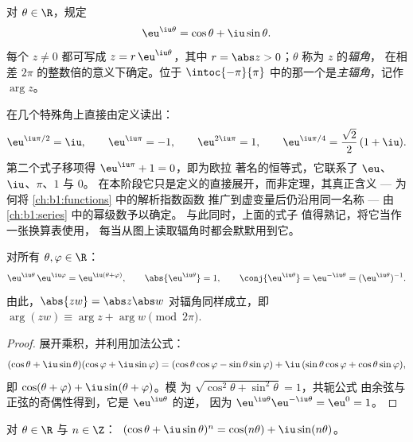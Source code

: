 \begin{definition}[纯虚指数的复指数]\label{def:b1:complex:expi}
对 $\theta \in \R$，规定
\[
\eu^{\iu\theta} = \cos\theta + \iu \sin\theta .
\]
每个 $z \neq 0$ 都可写成 $z = r\,\eu^{\iu\theta}$，其中 $r =
\abs z > 0$；$\theta$ 称为 $z$ 的\emph{辐角}，
在相差 $2\pi$ 的整数倍的意义下确定。位于
$\intoc{-\pi}{\pi}$ 中的那一个是\emph{主辐角}，记作
$\arg z$。
\end{definition}

\begin{example}[若干初值与一个著名恒等式]\label{ex:b1:complex:eulerid}
在几个特殊角上直接由定义读出：
\[
\eu^{\iu\pi/2} = \iu, \qquad
\eu^{\iu\pi} = -1, \qquad
\eu^{2\iu\pi} = 1, \qquad
\eu^{\iu\pi/4} = \frac{\sqrt2}2\,(1 + \iu) .
\]
第二个式子移项得 $\eu^{\iu\pi} + 1 = 0$，即为欧拉
著名的恒等式，它联系了 $\eu$、$\iu$、$\pi$、$1$ 与 $0$。
在本阶段它只是定义的直接展开，而非定理，其真正含义 ---
为何将 \cref{ch:b1:functions} 中的解析指数函数
推广到虚变量后仍沿用同一名称 --- 由\cref{ch:b1:series}
中的幂级数予以确定。
与此同时，上面的式子
值得熟记，将它当作一张换算表使用，
每当从图上读取辐角时都会默默用到它。
\end{example}

\begin{theorem}[函数方程]\label{thm:b1:complex:funceq}
对所有 $\theta, \varphi \in \R$：
\[
\eu^{\iu\theta}\, \eu^{\iu\varphi} = \eu^{\iu(\theta + \varphi)},
\qquad
\abs{\eu^{\iu\theta}} = 1,
\qquad
\conj{\eu^{\iu\theta}} = \eu^{-\iu\theta} = (\eu^{\iu\theta})^{-1}.
\]
由此，$\abs{zw} = \abs z \abs w$ 对辐角同样成立，即
$\arg(zw) \equiv \arg z + \arg w \pmod{2\pi}$.
\end{theorem}

\begin{proof}
展开乘积，并利用加法公式：
\[
(\cos\theta + \iu\sin\theta)(\cos\varphi + \iu\sin\varphi)
= (\cos\theta\cos\varphi - \sin\theta\sin\varphi)
+ \iu\,(\sin\theta\cos\varphi + \cos\theta\sin\varphi),
\]
即 $\cos(\theta+\varphi) + \iu\sin(\theta+\varphi)$。模
为 $\sqrt{\cos^2\theta + \sin^2\theta} = 1$，共轭公式
由余弦与正弦的奇偶性得到，它是 $\eu^{\iu\theta}$ 的逆，
因为 $\eu^{\iu\theta}\eu^{-\iu\theta} = \eu^0 = 1$。
\end{proof}

\begin{corollary}[棣莫弗公式]\label{cor:b1:complex:demoivre}
对 $\theta \in \R$ 与 $n \in \Z$：
$\;(\cos\theta + \iu\sin\theta)^n = \cos(n\theta) +
\iu\sin(n\theta)$。
\end{corollary}

